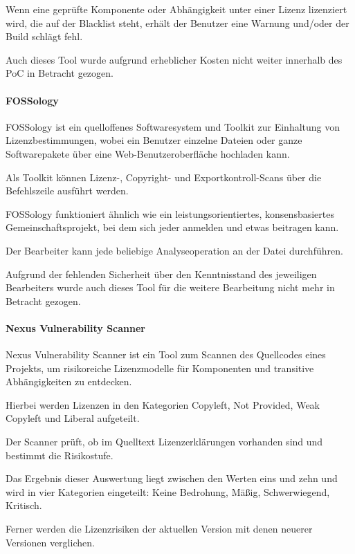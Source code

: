 Wenn eine geprüfte Komponente oder Abhängigkeit unter einer Lizenz lizenziert wird, die auf der Blacklist steht, erhält der Benutzer eine Warnung und/oder der Build schlägt fehl.

Auch dieses Tool wurde aufgrund erheblicher Kosten nicht weiter innerhalb des PoC in Betracht gezogen. 

\paragraph{FOSSology}

FOSSology ist ein quelloffenes Softwaresystem und Toolkit zur Einhaltung von Lizenzbestimmungen, wobei ein Benutzer einzelne Dateien oder ganze Softwarepakete über eine Web-Benutzeroberfläche hochladen kann. \cite{fossology_workgroup_fossology_2017} 

Als Toolkit können Lizenz-, Copyright- und Exportkontroll-Scans über die Befehlszeile ausführt werden.

FOSSology funktioniert ähnlich wie ein leistungsorientiertes, konsensbasiertes Gemeinschaftsprojekt, bei dem sich jeder anmelden und etwas beitragen kann. 

Der Bearbeiter kann jede beliebige Analyseoperation an der Datei durchführen. 

Aufgrund der fehlenden Sicherheit über den Kenntnisstand des jeweiligen Bearbeiters wurde auch dieses Tool für die weitere Bearbeitung nicht mehr in Betracht gezogen. 

\paragraph{Nexus Vulnerability Scanner}

Nexus Vulnerability Scanner ist ein Tool zum Scannen des Quellcodes eines Projekts, um risikoreiche Lizenzmodelle für Komponenten und transitive Abhängigkeiten zu entdecken. \cite{sonatype_nexus_2008} 

Hierbei werden Lizenzen in den Kategorien Copyleft, Not Provided, Weak Copyleft und Liberal aufgeteilt. 

Der Scanner prüft, ob im Quelltext Lizenzerklärungen vorhanden sind und bestimmt die Risikostufe. 

Das Ergebnis dieser Auswertung liegt zwischen den Werten eins und zehn und wird in vier Kategorien eingeteilt: Keine Bedrohung, Mäßig, Schwerwiegend, Kritisch. \cite{sonatype_guide_nodate} 

Ferner werden die Lizenzrisiken der aktuellen Version mit denen neuerer Versionen verglichen. 

